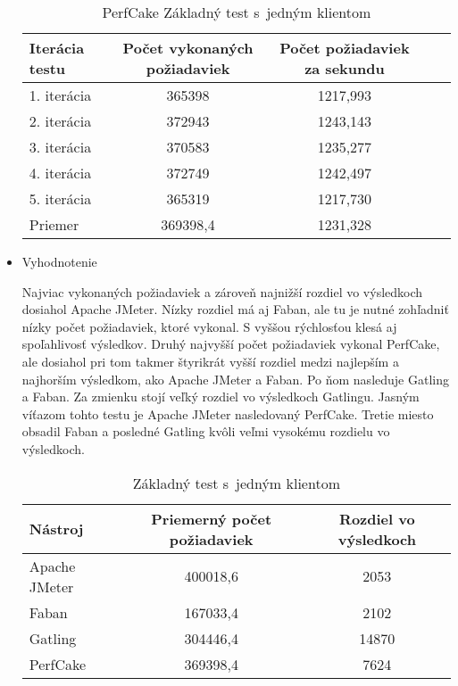 \documentclass[12pt,oneside,final]{fithesis-utf8}
\begin{document}
\begin{itemize}
\begin{table}[H]
\begin{center}
\begin{tabular}{ | l | c | c | c | c |}
		\hline
		 \textbf{Iterácia testu} & \textbf{Počet vykonaných požiadaviek} & \textbf{Počet požiadaviek za sekundu} \\ \hline
		 1. iterácia & 365398 & 1217,993 \\ \hline
		 2. iterácia & 372943 & 1243,143 \\ \hline
		 3. iterácia & 370583 & 1235,277 \\ \hline
		 4. iterácia & 372749 & 1242,497 \\ \hline
		 5. iterácia & 365319 & 1217,730 \\ \hline
		 Priemer & 369398,4 & 1231,328 \\ \hline
		 
\end{tabular}
\end{center}
\caption{PerfCake Základný test s~jedným klientom}
\end{table}

\item Vyhodnotenie

Najviac vykonaných požiadaviek a zároveň najnižší rozdiel vo výsledkoch dosiahol Apache JMeter. Nízky rozdiel má aj Faban, ale  tu je nutné zohľadniť nízky počet požiadaviek, ktoré vykonal. S vyššou rýchlosťou klesá aj spoľahlivosť výsledkov. Druhý najvyšší počet požiadaviek vykonal PerfCake, ale dosiahol pri tom takmer štyrikrát vyšší rozdiel medzi najlepším a najhorším výsledkom, ako Apache JMeter a Faban. Po ňom nasleduje Gatling a Faban. Za zmienku stojí veľký rozdiel vo výsledkoch Gatlingu. Jasným víťazom tohto testu je Apache JMeter nasledovaný PerfCake. Tretie miesto obsadil Faban a posledné Gatling kvôli veľmi vysokému rozdielu vo výsledkoch.

\begin{table}[H]
\begin{center}
\begin{tabular}{ | l | c | c |}
		\hline
		 \textbf{Nástroj} & \textbf{Priemerný počet požiadaviek} & \textbf{Rozdiel vo výsledkoch} \\ \hline
		 Apache JMeter & 400018,6 & 2053 \\ \hline
		 Faban & 167033,4 & 2102 \\ \hline
		 Gatling & 304446,4 & 14870 \\ \hline
		 PerfCake & 369398,4 & 7624 \\ \hline
\end{tabular}
\end{center}
\caption{Základný test s~jedným klientom}
\end{table}

\end{itemize}
\end{document}
